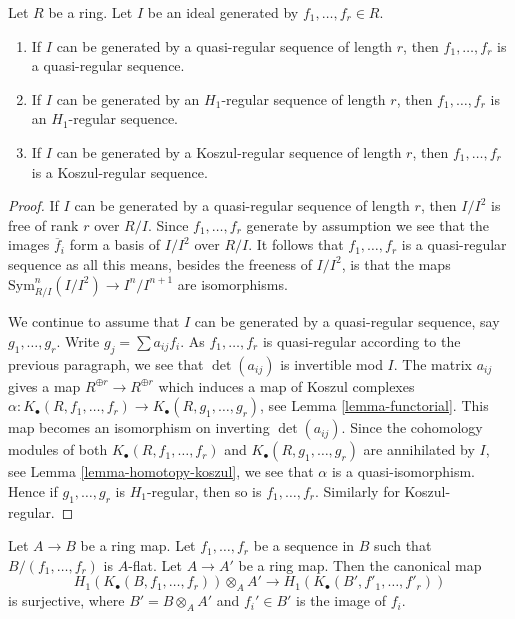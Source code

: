 \begin{lemma}
\label{lemma-independence-of-generators}
Let $R$ be a ring. Let $I$ be an ideal generated by $f_1, \ldots, f_r \in R$.
\begin{enumerate}
\item If $I$ can be generated by a quasi-regular sequence of length $r$,
then $f_1, \ldots, f_r$ is a quasi-regular sequence.
\item If $I$ can be generated by an $H_1$-regular sequence of length $r$,
then $f_1, \ldots, f_r$ is an $H_1$-regular sequence.
\item If $I$ can be generated by a Koszul-regular sequence of length $r$,
then $f_1, \ldots, f_r$ is a Koszul-regular sequence.
\end{enumerate}
\end{lemma}

\begin{proof}
If $I$ can be generated by a quasi-regular sequence of length $r$,
then $I/I^2$ is free of rank $r$ over $R/I$. Since $f_1, \ldots, f_r$
generate by assumption we see that the images $\overline{f}_i$ form a basis of
$I/I^2$ over $R/I$. It follows that $f_1, \ldots, f_r$ is a quasi-regular
sequence as all this means, besides the freeness of $I/I^2$, is that the maps
$\text{Sym}^n_{R/I}(I/I^2) \to I^n/I^{n + 1}$ are isomorphisms.

\medskip\noindent
We continue to assume that $I$ can be generated by a
quasi-regular sequence, say
$g_1, \ldots, g_r$. Write $g_j = \sum a_{ij}f_i$. As $f_1, \ldots, f_r$
is quasi-regular according to the previous paragraph, we see that
$\det(a_{ij})$ is invertible mod $I$. The matrix
$a_{ij}$ gives a map $R^{\oplus r} \to R^{\oplus r}$ which induces
a map of Koszul complexes
$\alpha : K_\bullet(R, f_1, \ldots, f_r) \to K_\bullet(R, g_1, \ldots, g_r)$,
see
Lemma \ref{lemma-functorial}.
This map becomes an isomorphism on inverting $\det(a_{ij})$.
Since the cohomology modules of both $K_\bullet(R, f_1, \ldots, f_r)$ and
$K_\bullet(R, g_1, \ldots, g_r)$ are annihilated by $I$, see
Lemma \ref{lemma-homotopy-koszul},
we see that $\alpha$ is a quasi-isomorphism. Hence if $g_1, \ldots, g_r$
is $H_1$-regular, then so is $f_1, \ldots, f_r$. Similarly
for Koszul-regular.
\end{proof}

\begin{lemma}
\label{lemma-base-change-H1-regular}
Let $A \to B$ be a ring map.
Let $f_1, \ldots, f_r$ be a sequence in $B$ such that $B/(f_1, \ldots, f_r)$
is $A$-flat. Let $A \to A'$ be a ring map. Then the canonical map
$$
H_1(K_\bullet(B, f_1, \ldots, f_r)) \otimes_A A'
\longrightarrow
H_1(K_\bullet(B', f'_1, \ldots, f'_r))
$$
is surjective, where $B' = B \otimes_A A'$ and $f_i' \in B'$ is the image
of $f_i$.
\end{lemma}

